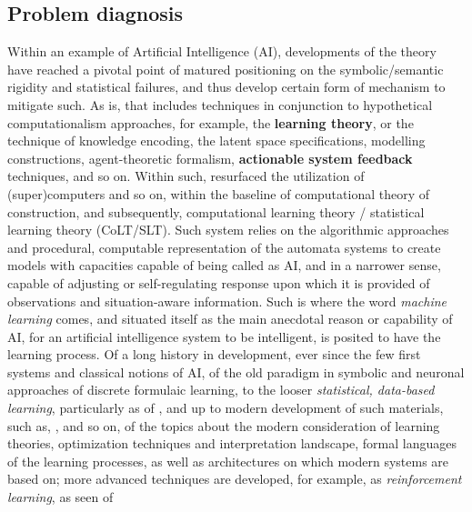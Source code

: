 \subsection{Problem diagnosis}
Within an example of Artificial Intelligence (AI), developments of the theory have reached a pivotal point of matured positioning on the symbolic/semantic rigidity and statistical failures, and thus develop certain form of mechanism to mitigate such. As is, that includes techniques in conjunction to hypothetical computationalism approaches, for example, the \textbf{learning theory}, or the technique of knowledge encoding, the latent space specifications, modelling constructions, agent-theoretic formalism, \textbf{actionable system feedback} techniques, and so on. Within such, resurfaced the utilization of (super)computers and so on, within the baseline of computational theory of construction, and subsequently, computational learning theory / statistical learning theory (CoLT/SLT). Such system relies on the algorithmic approaches and procedural, computable representation of the automata systems to create models with capacities capable of being called as AI, and in a narrower sense, capable of adjusting or self-regulating response upon which it is provided of observations and situation-aware information. Such is where the word \textit{machine learning} comes, and situated itself as the main anecdotal reason or capability of AI, for an artificial intelligence system to be intelligent, is posited to have the learning process. Of a long history in development, ever since the few first systems and classical notions of AI, \cite{mcculloch_pitts_1943,Rosenblatt1958ThePA,minsky_papert_1969,hebb_1949,Robbins:1951,widrow_hoff_1960_adaline,Hestenes:1952} of the old paradigm in symbolic and neuronal approaches of discrete formulaic learning, to the looser \textit{statistical, data-based learning}, particularly as of \cite{10.1145/1968.1972,Vapnik1999-VAPTNO,10.5555/200548,hopfield_1982,fukushima_1980,cybenko_1989,bishop_1995,haykin_1994,kohonen_1982,6797087,nemirovski_yudin_1983,amari_rattray_saad_1998_natural_gradient_online,10.5555/2371238}, and up to modern development of such materials, such as, \cite{Jacot:2018:NTK,khan_bayesian_2024,buschjager_generalized_2020,Manin_2024,devlin_2018_bert,goodfellow2016deep,kaplan2020scalinglawsneurallanguage,Bronstein_2017,bronstein2021geometricdeeplearninggrids,luoConvergenceCoordinateDescent1992,tseng2001convergence,friedman2007pathwise,hu_model_2021,wright2015coordinate,janik2021complexitydeepneuralnetworks}, and so on, of the topics about the modern consideration of learning theories, optimization techniques and interpretation landscape, formal languages of the learning processes, as well as architectures on which modern systems are based on; more advanced techniques are developed, for example, as \textit{reinforcement learning}, as seen of 